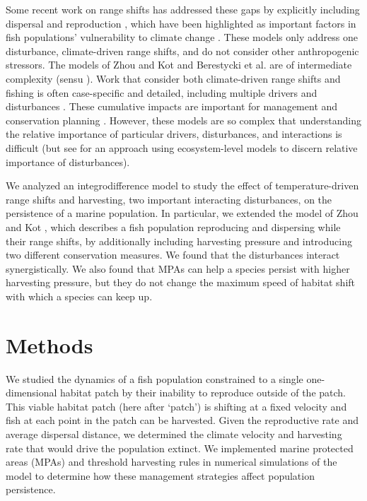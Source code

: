 \documentclass[]{article}
\begin{document}
Some recent work on range shifts has addressed these gaps by explicitly including dispersal and reproduction \citep{Berestyckietal2009, ZhouKot2011}, which have been highlighted as important factors in fish populations' vulnerability to climate change \citep{Fordhametal2013, Hastingsetal2005}.  These models only address one disturbance, climate-driven range shifts, and do not consider other anthropogenic stressors.  The models of Zhou and Kot
\citep{ZhouKot2011} and Berestycki et al. \citep{Berestyckietal2009} are of
intermediate complexity (sensu
\citep{Gaylordetal2005}).  Work that consider both climate-driven
range shifts and fishing is often case-specific and detailed, including
multiple drivers and disturbances \citep{Cheungetal2010, Lindegrenetal2010, Brownetal2010, Merinoetal2010, Merinoetal2010b, Plaganyietal2011, Ainsworthetal2011, Zhangetal2011,
Barangeetal2011, Howardetal2013}. These cumulative
impacts are important for management and conservation planning
\citep{Allisonetal2009}.  However, these models are
so complex that understanding the relative importance of particular
drivers, disturbances, and interactions is difficult (but see
\citep{Nyeetal2013} for an approach using ecosystem-level models to discern
relative importance of disturbances).  

We analyzed an integrodifference model to study the effect of temperature-driven range shifts and
harvesting, two important interacting disturbances, on the persistence of a marine population. In particular, we extended the model of
Zhou and Kot \citep{ZhouKot2011}, which describes a fish population
reproducing and dispersing while their range shifts, by
additionally including harvesting pressure and introducing two different
conservation measures. We found that the disturbances interact
synergistically. We also found that MPAs can help a species persist with
higher harvesting pressure, but they do not change the maximum speed of
habitat shift with which a species can keep up.


\section{Methods}

We studied the dynamics of a fish population constrained to a single one-dimensional habitat patch by their inability to reproduce outside of the patch.  This viable habitat patch (here after `patch') is shifting at a fixed velocity and fish at each point in the patch can be harvested.  Given the reproductive rate and average dispersal distance, we determined the climate velocity and harvesting rate that would drive the population extinct.  We implemented marine protected areas (MPAs) and threshold harvesting rules in numerical simulations of the model to 
determine how these management strategies affect population persistence.
\end{document}
